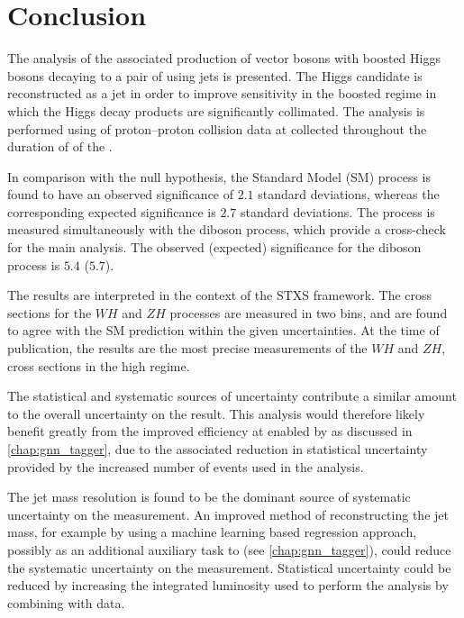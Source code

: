 \section{Conclusion}

The analysis of the associated production of vector bosons with boosted Higgs bosons decaying to a pair of \bquarks using \largeR jets is presented.
The Higgs candidate is reconstructed as a \largeR jet in order to improve sensitivity in the boosted regime in which the Higgs decay products are significantly collimated.
The analysis is performed using \intlumi of proton--proton collision data at  collected throughout the duration of \runtwo of the \LHC.

In comparison with the null hypothesis, the Standard Model (SM) \VHbb process is found to have an observed significance of $2.1$ standard deviations, whereas the corresponding expected significance is $2.7$ standard deviations.
The \VHbb process is measured simultaneously with the diboson \VZbb process, which provide a cross-check for the main analysis. 
The observed (expected) significance for the diboson process is $5.4$ ($5.7$).

The results are interpreted in the context of the STXS framework.
The cross sections for the $WH$ and $ZH$ processes are measured in two \ptv bins, and are found to agree with the SM prediction within the given uncertainties.
At the time of publication, the results are the most precise measurements of the $WH$ and $ZH$, \Hbb cross sections in the high \ptv regime.

The statistical and systematic sources of uncertainty contribute a similar amount to the overall uncertainty on the result.
This analysis would therefore likely benefit greatly from the improved \btagging efficiency at \highpt enabled by \GNN as discussed in \cref{chap:gnn_tagger}, due to the associated reduction in statistical uncertainty provided by the increased number of events used in the analysis.

The \largeR jet mass resolution is found to be the dominant source of systematic uncertainty on the \muVH measurement.
An improved method of reconstructing the \largeR jet mass, for example by using a machine learning based regression approach, possibly as an 
additional auxiliary task to \GNN (see \cref{chap:gnn_tagger}), could reduce the systematic uncertainty on the \muVH measurement.
Statistical uncertainty could be reduced by increasing the integrated luminosity used to perform the analysis by combining with \runthree data.
